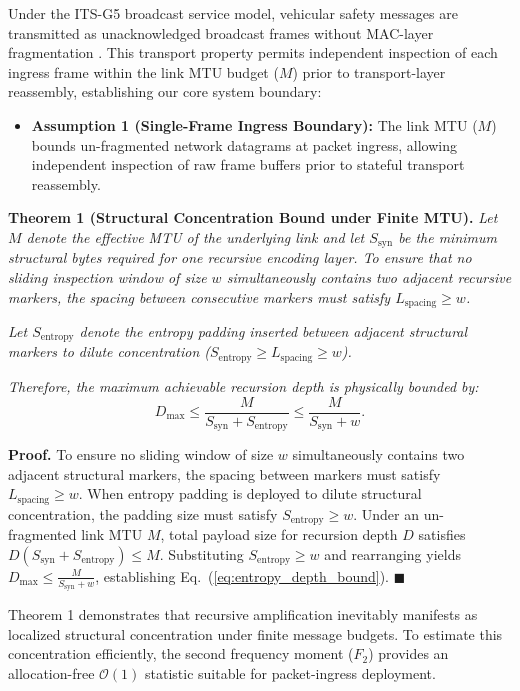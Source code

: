 \documentclass[conference]{IEEEtran}
\begin{document}
Under the ITS-G5 broadcast service model, vehicular safety messages are transmitted as unacknowledged broadcast frames without MAC-layer fragmentation \cite{IEEE80211_2020}. This transport property permits independent inspection of each ingress frame within the link MTU budget ($M$) prior to transport-layer reassembly, establishing our core system boundary:
\begin{itemize}
    \item \textbf{Assumption 1 (Single-Frame Ingress Boundary):} The link MTU ($M$) bounds un-fragmented network datagrams at packet ingress, allowing independent inspection of raw frame buffers prior to stateful transport reassembly.
\end{itemize}

\textbf{Theorem 1 (Structural Concentration Bound under Finite MTU).}
\textit{
Let $M$ denote the effective MTU of the underlying link and let $S_{\mathrm{syn}}$ be the minimum structural bytes required for one recursive encoding layer. To ensure that no sliding inspection window of size $w$ simultaneously contains two adjacent recursive markers, the spacing between consecutive markers must satisfy $L_{\mathrm{spacing}}\ge w$.
}

\textit{
Let $S_{\mathrm{entropy}}$ denote the entropy padding inserted between adjacent structural markers to dilute concentration ($S_{\mathrm{entropy}} \ge L_{\mathrm{spacing}} \ge w$).
}

\textit{
Therefore, the maximum achievable recursion depth is physically bounded by:
}
\begin{equation}
D_{\max} \le \frac{M}{S_{\mathrm{syn}}+S_{\mathrm{entropy}}} \le \frac{M}{S_{\mathrm{syn}}+w}.
\label{eq:entropy_depth_bound}
\end{equation}

\textbf{Proof.}
To ensure no sliding window of size $w$ simultaneously contains two adjacent structural markers, the spacing between markers must satisfy $L_{\mathrm{spacing}} \ge w$. When entropy padding is deployed to dilute structural concentration, the padding size must satisfy $S_{\mathrm{entropy}} \ge w$. Under an un-fragmented link MTU $M$, total payload size for recursion depth $D$ satisfies $D(S_{\mathrm{syn}} + S_{\mathrm{entropy}}) \le M$. Substituting $S_{\mathrm{entropy}} \ge w$ and rearranging yields $D_{\max} \le \frac{M}{S_{\mathrm{syn}}+w}$, establishing Eq.~(\ref{eq:entropy_depth_bound}).
\hfill$\blacksquare$

Theorem 1 demonstrates that recursive amplification inevitably manifests as localized structural concentration under finite message budgets. To estimate this concentration efficiently, the second frequency moment ($F_2$) provides an allocation-free $\mathcal{O}(1)$ statistic suitable for packet-ingress deployment.
\end{document}
